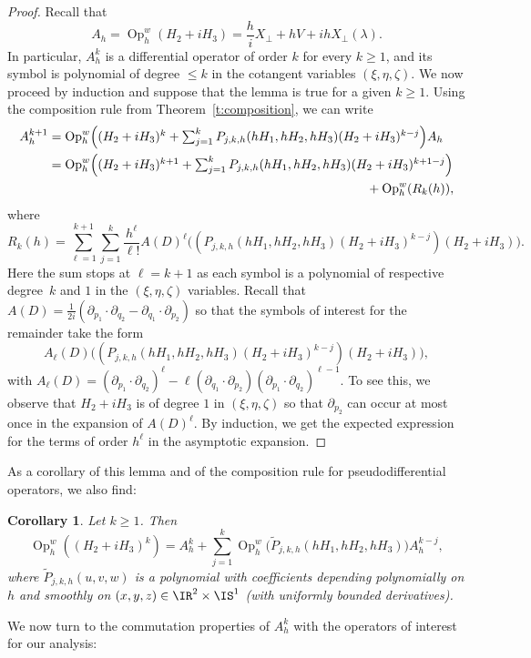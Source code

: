 \documentclass[10pt]{amsart}
\theoremstyle{plain}
\newtheorem{coro}[theo]{Corollary}
\theoremstyle{definition}
\theoremstyle{remark}
\newcommand{\Op}{\operatorname{Op}}
\begin{document}
\begin{proof}
Recall that
\[
A_h=\Op_h^w(H_2+iH_3)=\frac{h}{i}X_\perp+hV+ihX_\perp(\lambda).
\]
In particular, $A_h^k$ is a differential operator of order $k$ for every $k\geq 1$, and its symbol is polynomial of degree $\leq k$ in the cotangent variables $(\xi,\eta,\zeta)$. We now proceed by induction and suppose that the lemma is true for a given $k\geq 1$. Using the composition rule from Theorem~\ref{t:composition}, we can write
\begin{align*}
A_h^{k+1} & =\textstyle\Op_h^w\Bigl((H_2+iH_3)^k+\sum_{j=1}^{k}P_{j,k,h}(hH_1,hH_2,hH_3)(H_2+iH_3)^{k-j}\Bigr)A_h\\
& = \textstyle\Op_h^w\Bigl((H_2+iH_3)^{k+1}+\sum_{j=1}^{k}P_{j,k,h}(hH_1,hH_2,hH_3)(H_2+iH_3)^{k+1-j}\Bigr) \\
& \hspace*{8.8cm} +\Op_h^w(R_k(h)),
\end{align*}
where
\[
R_k(h)=
\sum_{\ell=1}^{k+1}\sum_{j=1}^{k}\frac{h^{\ell}}{\ell!}A(D)^\ell\bigl((P_{j,k,h}(hH_1,hH_2,hH_3)(H_2+iH_3)^{k-j})(H_2+iH_3)\bigr).
\]
Here the sum stops at $\ell=k+1$ as each symbol is a polynomial of respective degree~$k$ and $1$ in the $(\xi,\eta,\zeta)$ variables. Recall that $A(D)=\frac{1}{2i}\left(\partial_{p_1}\cdot\partial_{q_2}-\partial_{q_1}\cdot\partial_{p_2}\right)$ so that the symbols of interest for the remainder take the form
\[
A_\ell(D)\bigl((P_{j,k,h}(hH_1,hH_2,hH_3)(H_2+iH_3)^{k-j})(H_2+iH_3)\bigr),
\]
with $A_\ell(D) = (\partial_{p_1}\cdot\partial_{q_2})^\ell-\ell(\partial_{q_1}\cdot\partial_{p_2})(\partial_{p_1}\cdot\partial_{q_2})^{\ell-1}$. To see this, we observe that $H_2+iH_3$ is of degree $1$ in $(\xi,\eta,\zeta)$ so that $\partial_{p_2}$ can occur at most once in the expansion of $A(D)^\ell$. By induction, we get the expected expression for the terms of order $h^{\ell}$ in the asymptotic expansion.
\end{proof}

As a corollary of this lemma and of the composition rule for pseudodifferential operators, we also find:
\begin{coro}\label{c:A:power-k} Let $k\geq 1$. Then
\[
\Op_h^w((H_2+iH_3)^k)=A_h^k+\sum_{j=1}^{k}\Op_h^w\bigl(\tilde{P}_{j,k,h}(hH_1,hH_2,hH_3)\bigr)A_h^{k-j},
\]
where $\tilde{P}_{j,k,h}(u,v,w)$ is a polynomial with coefficients depending polynomially on $h$ and smoothly on $(x,y,z)\in\IR^2\times\IS^1$ (with uniformly bounded derivatives).
\end{coro}

We now turn to the commutation properties of $A_h^k$ with the operators of interest for our analysis:
\end{document}
